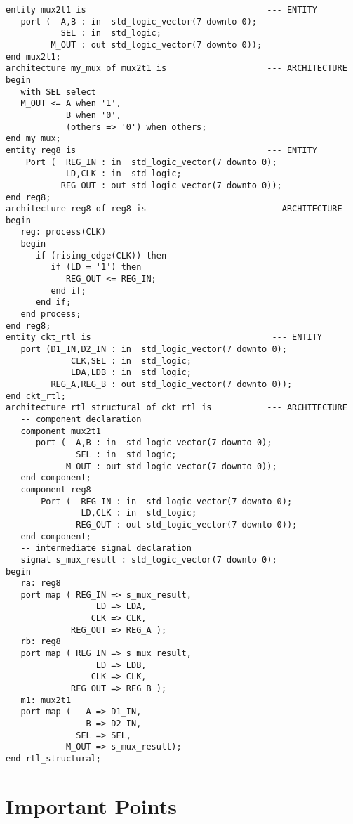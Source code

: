 \noindent
\begin{minipage}{0.99\linewidth}
\begin{lstlisting}[label=ex25_code, caption=Solution to Example~25 using a structural modeling approach.]
entity mux2t1 is                                    --- ENTITY
   port (  A,B : in  std_logic_vector(7 downto 0);
           SEL : in  std_logic;
         M_OUT : out std_logic_vector(7 downto 0));
end mux2t1;
architecture my_mux of mux2t1 is                    --- ARCHITECTURE
begin
   with SEL select
   M_OUT <= A when '1',
            B when '0',
            (others => '0') when others;
end my_mux;
entity reg8 is                                      --- ENTITY
    Port (  REG_IN : in  std_logic_vector(7 downto 0);
            LD,CLK : in  std_logic;
           REG_OUT : out std_logic_vector(7 downto 0));
end reg8;
architecture reg8 of reg8 is                       --- ARCHITECTURE
begin
   reg: process(CLK)
   begin
      if (rising_edge(CLK)) then
         if (LD = '1') then
            REG_OUT <= REG_IN;
         end if;
      end if;
   end process;
end reg8;
entity ckt_rtl is                                    --- ENTITY
   port (D1_IN,D2_IN : in  std_logic_vector(7 downto 0);
             CLK,SEL : in  std_logic;
             LDA,LDB : in  std_logic;
         REG_A,REG_B : out std_logic_vector(7 downto 0));
end ckt_rtl;
architecture rtl_structural of ckt_rtl is           --- ARCHITECTURE
   -- component declaration
   component mux2t1
      port (  A,B : in  std_logic_vector(7 downto 0);
              SEL : in  std_logic;
            M_OUT : out std_logic_vector(7 downto 0));
   end component;
   component reg8
       Port (  REG_IN : in  std_logic_vector(7 downto 0);
               LD,CLK : in  std_logic;
              REG_OUT : out std_logic_vector(7 downto 0));
   end component;
   -- intermediate signal declaration
   signal s_mux_result : std_logic_vector(7 downto 0);
begin
   ra: reg8
   port map ( REG_IN => s_mux_result,
                  LD => LDA,
                 CLK => CLK,
             REG_OUT => REG_A );
   rb: reg8
   port map ( REG_IN => s_mux_result,
                  LD => LDB,
                 CLK => CLK,
             REG_OUT => REG_B );
   m1: mux2t1
   port map (   A => D1_IN,
                B => D2_IN,
              SEL => SEL,
            M_OUT => s_mux_result);
end rtl_structural;
\end{lstlisting}
\end{minipage}

\section{Important Points}

